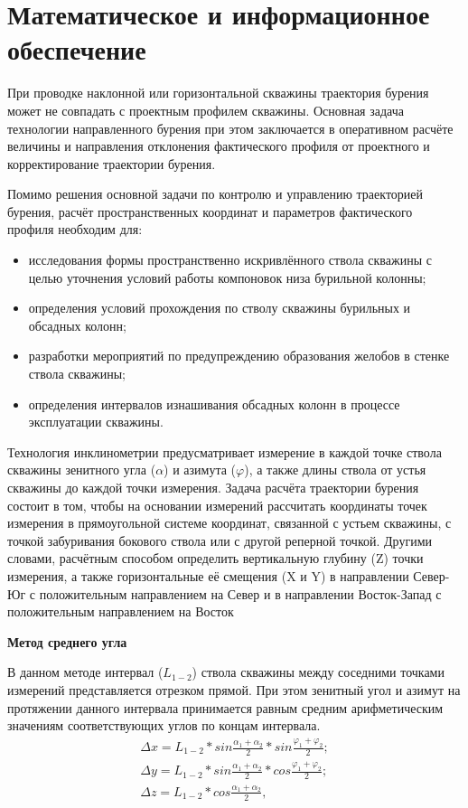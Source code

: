 \newpage
\section{Математическое и информационное обеспечение }

При проводке наклонной или горизонтальной скважины траектория бурения может не совпадать с проектным профилем скважины. Основная
задача технологии направленного бурения при этом заключается в оперативном расчёте величины и направления отклонения фактического профиля от
проектного и корректирование траектории бурения.

Помимо решения основной задачи по контролю и управлению траекторией бурения, расчёт пространственных координат и параметров фактического профиля необходим для:
\begin{itemize}
  \item исследования формы пространственно искривлённого ствола скважины с целью уточнения условий работы компоновок низа бурильной колонны;
  \item определения условий прохождения по стволу скважины бурильных и обсадных колонн;
  \item разработки мероприятий по предупреждению образования желобов в стенке ствола скважины;
  \item определения интервалов изнашивания обсадных колонн в процессе эксплуатации скважины.
\end{itemize}

Технология инклинометрии предусматривает измерение в каждой точке ствола скважины зенитного угла ($ \alpha $) и азимута ($ \varphi $), а также длины ствола от
устья скважины до каждой точки измерения. Задача расчёта траектории бурения состоит в том, чтобы на основании измерений рассчитать координаты
точек измерения в прямоугольной системе координат, связанной с устьем скважины, с точкой забуривания бокового ствола или с другой реперной
точкой. Другими словами, расчётным способом определить вертикальную глубину (Z) точки измерения, а также горизонтальные её смещения (X и Y) в
направлении Север-Юг с положительным направлением на Север и в направлении Восток-Запад с положительным направлением на Восток

\textbf{Метод среднего угла}

В данном методе интервал ($ L_{1-2} $) ствола скважины между соседними точками измерений представляется отрезком прямой. При этом зенитный угол
и азимут на протяжении данного интервала принимается равным средним арифметическим значениям соответствующих углов по концам интервала.
\begin{equation}
  \begin{split}
    \Delta x = L_{1-2} * sin \frac{\alpha_1 + \alpha_2}{2} * sin \frac{\varphi_1 + \varphi_2}{2};\\
    \Delta y = L_{1-2} * sin \frac{\alpha_1 + \alpha_2}{2} * cos \frac{\varphi_1 + \varphi_2}{2};\\
    \Delta z = L_{1-2} * cos \frac{\alpha_1 + \alpha_2}{2},
  \end{split}
\end{equation}

